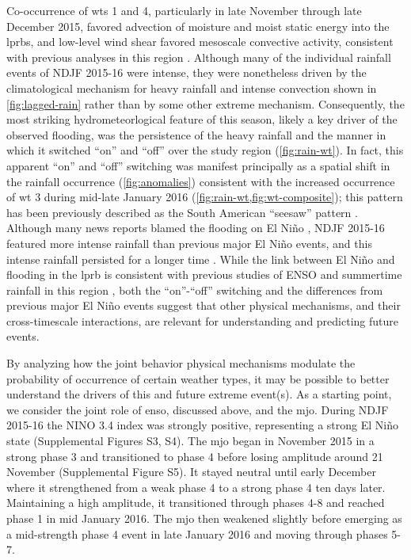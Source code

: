 \documentclass{ametsoc}
\begin{document}
Co-occurrence of \glspl{wt} 1 and 4, particularly in late November through late December 2015, favored advection of moisture and moist static energy into the \glspl{lprb}, and low-level wind shear favored mesoscale convective activity, consistent with previous analyses in this region \citep{Velasco1987,Marengo2004,Saulo2007,Salio2007}.
Although many of the individual rainfall events of NDJF 2015-16 were intense, they were nonetheless driven by the climatological mechanism for heavy rainfall and intense convection shown in \cref{fig:lagged-rain} rather than by some other extreme mechanism.
Consequently, the most striking hydrometeorlogical feature of this season, likely a key driver of the observed flooding, was the persistence of the heavy rainfall and the manner in which it switched ``on'' and ``off'' over the study region (\cref{fig:rain-wt}).
In fact, this apparent ``on'' and ``off'' switching was manifest principally as a spatial shift in the rainfall occurrence (\cref{fig:anomalies}) consistent with the increased occurrence of \gls{wt} 3 during mid-late January 2016 (\cref{fig:rain-wt,fig:wt-composite}); this pattern has been previously described as the South American ``seesaw'' pattern \citep{Nogues-Paegle1997}.
Although many news reports blamed the flooding on El Ni\~{n}o \citep{BBC2015}, NDJF 2015-16 featured more intense rainfall than previous major El Ni\~no events, and this intense rainfall persisted for a longer time .
While the link between El Ni\~{n}o and flooding in the \gls{lprb} is consistent with previous studies of ENSO and summertime rainfall in this region \citep{Velasco1987,Grimm2000,Salio2002,Grimm2003,Carvalho2004,Grimm2009a,Bravo2011}, both the ``on''-``off'' switching and the differences from previous major El Ni\~{n}o events suggest that other physical mechanisms, and their cross-timescale interactions, are relevant for understanding and predicting future events.

By analyzing how the joint behavior physical mechanisms modulate the probability of occurrence of certain weather types, it may be possible to better understand the drivers of this and future extreme event(s).
As a starting point, we consider the joint role of \gls{enso}, discussed above, and the \gls{mjo}.
During NDJF 2015-16 the NINO 3.4 index was strongly positive, representing a strong El Ni\~{n}o state (Supplemental Figures S3, S4).
The \gls{mjo} began in November 2015 in a strong phase 3 and transitioned to phase 4 before losing amplitude around 21 November (Supplemental Figure S5).
It stayed neutral until early December where it strengthened from a weak phase 4 to a strong phase 4 ten days later.
Maintaining a high amplitude, it transitioned through phases 4-8 and reached phase 1 in mid January 2016.
The \gls{mjo} then weakened slightly before emerging as a mid-strength phase 4 event in late January 2016 and moving through phases 5-7.
\end{document}
